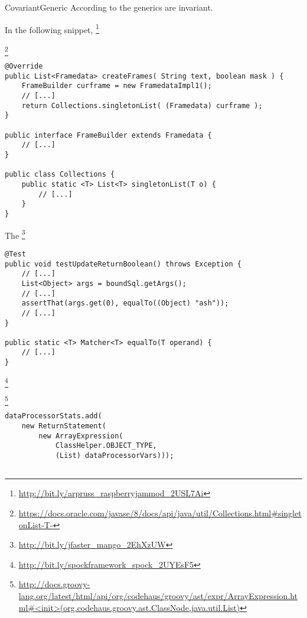 \begin{pattern}{CovariantGeneric}
According to the generics are invariant.

\instances{}
In the following snippet,%
\footnote{\url{http://bit.ly/arpruss_raspberryjammod_2USL7Ai}}


\footnote{\url{https://docs.oracle.com/javase/8/docs/api/java/util/Collections.html\#singletonList-T-}}

\begin{verbatim}
@Override
public List<Framedata> createFrames( String text, boolean mask ) {
    FrameBuilder curframe = new FramedataImpl1();
    // [...]
    return Collections.singletonList( (Framedata) curframe );
}

public interface FrameBuilder extends Framedata {
    // [...]
}

public class Collections {
    public static <T> List<T> singletonList(T o) {
        // [...]
    }
}
\end{verbatim}

The 
\footnote{\url{http://bit.ly/jfaster_mango_2EhXzUW}}

\begin{verbatim}
@Test
public void testUpdateReturnBoolean() throws Exception {
    // [...]
    List<Object> args = boundSql.getArgs();
    // [...]
    assertThat(args.get(0), equalTo((Object) "ash"));
    // [...]
}

public static <T> Matcher<T> equalTo(T operand) {
    // [...]
}
\end{verbatim}


\footnote{\url{http://bit.ly/spockframework_spock_2UYEsF5}}

\footnote{\url{http://docs.groovy-lang.org/latest/html/api/org/codehaus/groovy/ast/expr/ArrayExpression.html\#<init>(org.codehaus.groovy.ast.ClassNode,java.util.List)}}

\begin{verbatim}
dataProcessorStats.add(
    new ReturnStatement(
        new ArrayExpression(
            ClassHelper.OBJECT_TYPE,
            (List) dataProcessorVars)));


\end{verbatim}
\end{pattern}
